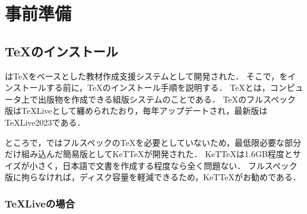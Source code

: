 
\addtocounter{page}{-1}

\chapter{事前準備}

\section{{\TeX}のインストール}

{\ketcindy}は{\TeX}をベースとした教材作成支援システムとして開発された．
そこで，{\ketcindy}をインストールする前に，{\TeX}のインストール手順を説明する．
{\TeX}とは，コンピュータ上で出版物を作成できる組版システムのことである．
{\TeX}のフルスペック版は{\TeX}Liveとして纏められたおり，毎年アップデートされ，最新版は{\TeX}Live2023である．

ところで，{\ketcindy}ではフルスペックの{\TeX}を必要としていないため，最低限必要な部分だけ組み込んだ簡易版としてKeT{\TeX}が開発された．
KeT{\TeX}は1.6GB程度とサイズが小さく，日本語で文書を作成する程度なら全く問題ない．
フルスペック版に拘らなければ，ディスク容量を軽減できるため，KeT{\TeX}がお勧めである．

\subsection{{\TeX}Liveの場合}


